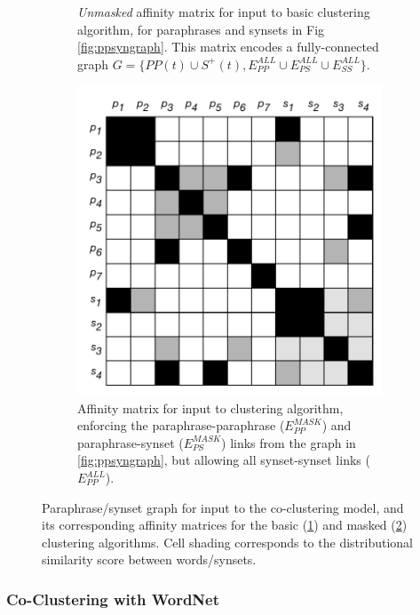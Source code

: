 \documentclass[11pt]{article}
\begin{document}
\begin{figure}[th]
\begin{subfigure}[t]{0.36\textwidth}
		\caption{\textit{Unmasked} affinity matrix for input to basic clustering algorithm, for paraphrases and synsets in Fig \ref{fig:ppsyngraph}. This matrix encodes a fully-connected graph $G = \{PP(t) \cup S^+(t), E_{PP}^{ALL} \cup E_{PS}^{ALL} \cup E_{SS}^{ALL} \}$.}
		\label{fig:ppsynmatall}
	\end{subfigure}
	\hfill%
	\begin{subfigure}[t]{0.36\textwidth}
		\includegraphics[width=\textwidth]{images/pp_syn_mat_mask.pdf}
		\caption{Affinity matrix for input to clustering algorithm, enforcing the paraphrase-paraphrase ($E_{PP}^{MASK}$) and paraphrase-synset ($E_{PS}^{MASK}$) links from the graph in \ref{fig:ppsyngraph}, but allowing all synset-synset links ($E_{PP}^{ALL}$). }
		\label{fig:ppsynmatmask}
	\end{subfigure}
	\caption{Paraphrase/synset graph for input to the co-clustering model, and its corresponding affinity matrices for the basic (\ref{fig:ppsynmatall}) and masked (\ref{fig:ppsynmatmask}) clustering algorithms. Cell shading corresponds to the distributional similarity score between words/synsets. }
	\label{fig:cocluster}
\end{figure}


\subsubsection{Co-Clustering with WordNet}
\end{document}
